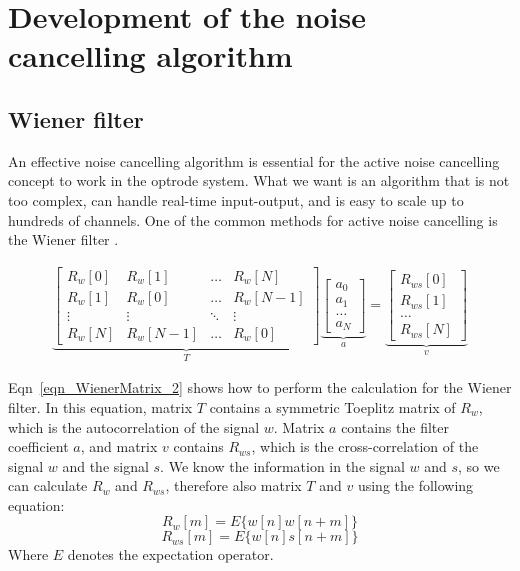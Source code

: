 \section{Development of the noise cancelling algorithm}

\subsection{Wiener filter}

An effective noise cancelling algorithm is essential for the active noise cancelling concept to work in the optrode system.  What we want is an algorithm that is not too complex, can handle real-time input-output, and is easy to scale up to hundreds of channels.  One of the common methods for active noise cancelling is the Wiener filter \cite{WienerPaper}. 

\begin{gather} \label{eqn_WienerMatrix_2}
\underbrace{
    \begin{bmatrix}
    R_w[0] & R_w[1] & \dots & R_w[N] \\
    R_w[1] & R_w[0] & \dots & R_w[N-1] \\
    \vdots & \vdots & \ddots & \vdots \\
    R_w[N] & R_w[N-1] & \dots & R_w[0]
    \end{bmatrix}
}_{T}
\underbrace{
    \begin{bmatrix}
    a_0 \\
    a_1 \\
    \dots \\
    a_N
    \end{bmatrix}
}_{a}
=
\underbrace{
    \begin{bmatrix}
    R_{ws}[0] \\
    R_{ws}[1] \\
    \dots \\
    R_{ws}[N]
    \end{bmatrix}
}_{v}
\end{gather}

Eqn~\ref{eqn_WienerMatrix_2} shows how to perform the calculation for the Wiener filter.  In this equation, matrix $T$ contains a symmetric Toeplitz matrix of $R_w$, which is the autocorrelation of the signal $w$.  Matrix $a$ contains the filter coefficient $a$, and matrix $v$ contains $R_{ws}$, which is the cross-correlation of the signal $w$ and the signal $s$.  We know the information in the signal $w$ and $s$, so we can calculate $R_w$ and $R_{ws}$, therefore also matrix $T$ and $v$ using the following equation:
$$R_w[m]=E\{w[n]w[n+m]\}$$
$$R_{ws}[m]=E\{w[n]s[n+m]\}$$
Where $E$ denotes the expectation operator.

